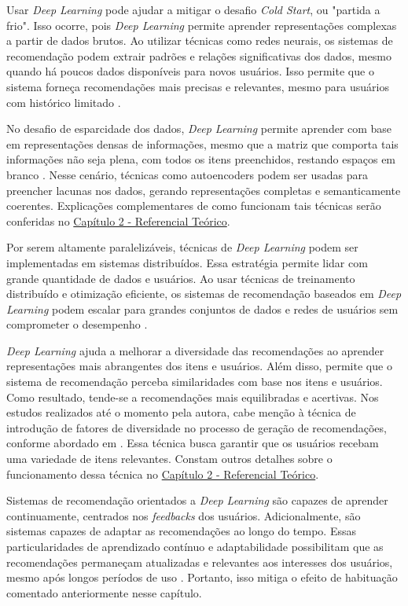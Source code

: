 Usar \textit{Deep Learning} pode ajudar a mitigar o desafio \textit{Cold Start}, ou "partida a frio". Isso ocorre, pois \textit{Deep Learning} 
permite aprender representações complexas a partir de dados brutos. Ao utilizar técnicas como redes neurais, os sistemas 
de recomendação podem extrair padrões e relações significativas dos dados, mesmo quando há poucos dados disponíveis para
novos usuários. Isso permite que o sistema forneça recomendações mais precisas e relevantes, mesmo para usuários com 
histórico limitado \cite{expressanalytics-cold-start-problem}.

No desafio de esparcidade dos dados, \textit{Deep Learning} permite aprender com base em representações densas de informações, 
mesmo que a matriz que comporta tais informações não seja plena, com todos os itens preenchidos, restando espaços em branco
\cite{HEIDARI2022109835}. Nesse cenário, técnicas como autoencoders podem ser usadas para preencher lacunas nos 
dados, gerando representações completas e semanticamente coerentes. Explicações complementares de como funcionam tais 
técnicas serão conferidas no \hyperref[chap:refteor]{Capítulo 2 - Referencial Teórico}.

Por serem altamente paralelizáveis, técnicas de \textit{Deep Learning} podem ser implementadas em sistemas distribuídos. 
Essa estratégia permite lidar com grande quantidade de dados e usuários. Ao usar técnicas de treinamento distribuído e 
otimização eficiente, os sistemas de recomendação baseados em \textit{Deep Learning} podem escalar para grandes conjuntos de dados
e redes de usuários sem comprometer o desempenho \cite{10.1145/2783258.2783270}.

\textit{Deep Learning} ajuda a melhorar a diversidade das recomendações ao aprender representações
mais abrangentes dos itens e usuários. Além disso, permite que o sistema de recomendação perceba similaridades com 
base nos itens e usuários. Como resultado, tende-se a recomendações mais equilibradas e acertivas. Nos estudos realizados 
até o momento pela autora, cabe menção à técnica de introdução de fatores de diversidade no processo de geração de 
recomendações, conforme abordado em . Essa técnica busca garantir que os usuários recebam uma variedade de 
itens relevantes. Constam outros detalhes sobre o funcionamento dessa técnica no \hyperref[chap:refteor]{Capítulo 2 - Referencial Teórico}.

Sistemas de recomendação orientados a \textit{Deep Learning} são capazes de aprender continuamente, centrados nos \textit{feedbacks}
dos usuários. Adicionalmente, são sistemas capazes de adaptar as recomendações ao longo do tempo.
Essas particularidades de aprendizado contínuo e adaptabilidade possibilitam que as recomendações permaneçam atualizadas
e relevantes aos interesses dos usuários, mesmo após longos períodos de uso \cite{lomonaco2019continual}. Portanto, isso mitiga o efeito de
habituação comentado anteriormente nesse capítulo.

